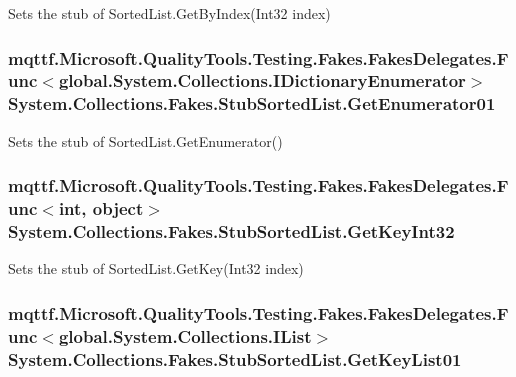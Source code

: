 Sets the stub of Sorted\-List.\-Get\-By\-Index(\-Int32 index)

\hypertarget{class_system_1_1_collections_1_1_fakes_1_1_stub_sorted_list_a74c03258a7c4320badef5cc793c6db33}{
\subsubsection[{Get\-Enumerator01}]{\setlength{\rightskip}{0pt plus 5cm}mqttf.\-Microsoft.\-Quality\-Tools.\-Testing.\-Fakes.\-Fakes\-Delegates.\-Func$<$global.\-System.\-Collections.\-I\-Dictionary\-Enumerator$>$ System.\-Collections.\-Fakes.\-Stub\-Sorted\-List.\-Get\-Enumerator01}}\label{class_system_1_1_collections_1_1_fakes_1_1_stub_sorted_list_a74c03258a7c4320badef5cc793c6db33}


Sets the stub of Sorted\-List.\-Get\-Enumerator()

\hypertarget{class_system_1_1_collections_1_1_fakes_1_1_stub_sorted_list_a9368cc7c6b311237a419680df7d44ff4}{
\subsubsection[{Get\-Key\-Int32}]{\setlength{\rightskip}{0pt plus 5cm}mqttf.\-Microsoft.\-Quality\-Tools.\-Testing.\-Fakes.\-Fakes\-Delegates.\-Func$<$int, object$>$ System.\-Collections.\-Fakes.\-Stub\-Sorted\-List.\-Get\-Key\-Int32}}\label{class_system_1_1_collections_1_1_fakes_1_1_stub_sorted_list_a9368cc7c6b311237a419680df7d44ff4}


Sets the stub of Sorted\-List.\-Get\-Key(\-Int32 index)

\hypertarget{class_system_1_1_collections_1_1_fakes_1_1_stub_sorted_list_a4a70e8247a328cfd4af7729a1ccd9ea6}{
\subsubsection[{Get\-Key\-List01}]{\setlength{\rightskip}{0pt plus 5cm}mqttf.\-Microsoft.\-Quality\-Tools.\-Testing.\-Fakes.\-Fakes\-Delegates.\-Func$<$global.\-System.\-Collections.\-I\-List$>$ System.\-Collections.\-Fakes.\-Stub\-Sorted\-List.\-Get\-Key\-List01}}\label{class_system_1_1_collections_1_1_fakes_1_1_stub_sorted_list_a4a70e8247a328cfd4af7729a1ccd9ea6}


